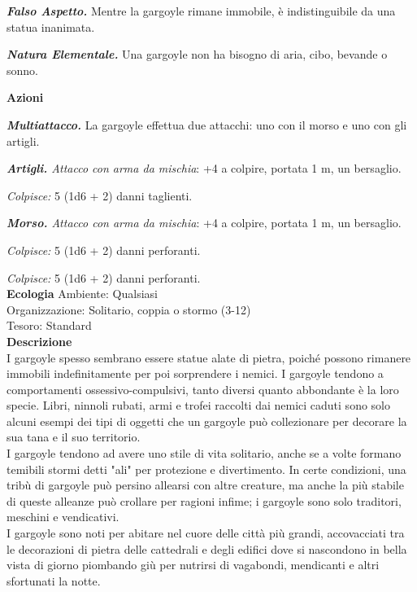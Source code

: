 \begin{multicols}{2}
\emph{\textbf{Falso Aspetto.}} Mentre la gargoyle rimane immobile, è indistinguibile da una statua inanimata.

\emph{\textbf{Natura Elementale.}} Una gargoyle non ha bisogno di aria, cibo, bevande o sonno.

\textbf{Azioni}

\emph{\textbf{Multiattacco.}} La gargoyle effettua due attacchi: uno con il morso e uno con gli artigli.

\emph{\textbf{Artigli.} Attacco con arma da mischia}: +4 a colpire, portata 1 m, un bersaglio.

\emph{Colpisce:} 5 (1d6 + 2) danni taglienti.

\emph{\textbf{Morso.} Attacco con arma da mischia}: +4 a colpire, portata 1 m, un bersaglio.

\emph{Colpisce:} 5 (1d6 + 2) danni perforanti.

\emph{Colpisce:} 5 (1d6 + 2) danni perforanti.\\
\textbf{Ecologia}
Ambiente: Qualsiasi\\
Organizzazione: Solitario, coppia o stormo (3-12)\\
Tesoro: Standard\\
\textbf{Descrizione}\\
I gargoyle spesso sembrano essere statue alate di pietra, poiché possono rimanere immobili indefinitamente per poi sorprendere i nemici. I gargoyle tendono a comportamenti ossessivo-compulsivi, tanto diversi quanto abbondante è la loro specie. Libri, ninnoli rubati, armi e trofei raccolti dai nemici caduti sono solo alcuni esempi dei tipi di oggetti che un gargoyle può collezionare per decorare la sua tana e il suo territorio.\\

I gargoyle tendono ad avere uno stile di vita solitario, anche se a volte formano temibili stormi detti "ali" per protezione e divertimento. In certe condizioni, una tribù di gargoyle può persino allearsi con altre creature, ma anche la più stabile di queste alleanze può crollare per ragioni infime; i gargoyle sono solo traditori, meschini e vendicativi.\\

I gargoyle sono noti per abitare nel cuore delle città più grandi, accovacciati tra le decorazioni di pietra delle cattedrali e degli edifici dove si nascondono in bella vista di giorno piombando giù per nutrirsi di vagabondi, mendicanti e altri sfortunati la notte.\\


\end{multicols}
